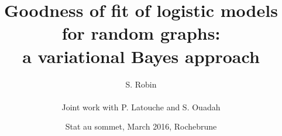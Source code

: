 \documentclass[10pt]{beamer}
\newcommand{\fignet}{../FIGURES}
\begin{document}

\title[GOF for graph models]{Goodness of fit of logistic models for random graphs: \\
a variational Bayes approach}

\author[S. Robin]{S. Robin \\ ~\\
  Joint work with P. Latouche and S. Ouadah}


\date[March 2016, Rochebrune]{Stat au sommet, March 2016, Rochebrune}

\maketitle

\end{document}
